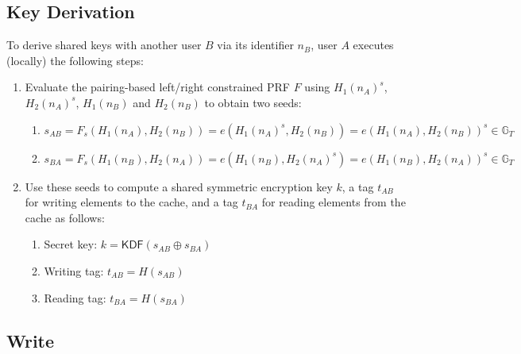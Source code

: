 \documentclass[11pt,letterpaper]{article}
\theoremstyle{definition}
\newcommand{\GG}{\mathbb{G}}
\newcommand{\kdf}{\mathsf{KDF}}
\begin{document}
\subsection{Key Derivation}\label{sec:key}

To derive shared keys with another user $B$ via its identifier $n_B$, user $A$
executes (locally) the following steps:

\begin{enumerate}

  \item Evaluate the pairing-based left/right constrained PRF $F$ using
        $H_1(n_A)^{s}$, $H_2(n_A)^{s}$, $H_1(n_B)$ and $H_2(n_B)$ to obtain two
        seeds:

        \begin{enumerate}

          \item $s_{AB} = F_s(H_1(n_A), H_2(n_B)) = e(H_1(n_A)^s, H_2(n_B)) =
                  e(H_1(n_A), H_2(n_B))^s \in \GG_T$

          \item $s_{BA} = F_s(H_1(n_B), H_2(n_A)) = e(H_1(n_B), H_2(n_A)^s) =
                  e(H_1(n_B), H_2(n_A))^s \in \GG_T$

        \end{enumerate}

  \item Use these seeds to compute a shared symmetric encryption key $k$, a
        tag $t_{AB}$ for writing elements to the cache, and a tag $t_{BA}$ for
        reading elements from the cache as follows:

        \begin{enumerate}

          \item Secret key: $k = \kdf(s_{AB} \oplus s_{BA} )$

          \item Writing tag: $t_{AB} = H(s_{AB})$

          \item Reading tag: $t_{BA} = H(s_{BA})$

        \end{enumerate}

\end{enumerate}



\subsection{Write}\label{sec:write}
\end{document}
